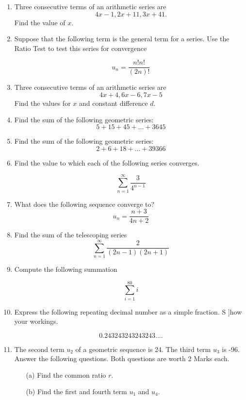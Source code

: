 \documentclass[a4paper,12pt]{article}
\begin{document}
\begin{enumerate}
\item Three consecutive terms of an arithmetic series are \[4x - 1, 2x +11, 3x + 41. \]
	Find the value of $x$.
	
\item Suppose that the following term is the general term for a series. Use the Ratio Test to test this series for convergence
	
	\[u_n=\frac{n!n!}{(2n)!}\]

\item 	Three consecutive terms of an arithmetic series are 
	\[4x+4,6x-6,7x-5\]
Find the values for $x$ and constant difference $d$.
\item Find the sum of the following geometric series: 
		\[5 + 15 + 45 +  \ldots + 3645\]
\item  Find the sum of the following geometric series: 
		\[2 + 6 + 18 +  \ldots + 39366		\]

\item Find the value to which each of the following series converges.

\[\sum_{n=1}^{\infty} \frac{3}{4^{n-1}}\]
\item What does the following sequence converge to?
 \[ u_n  = \frac{n+3}{4n+2}\]

\item Find the sum of the telescoping series  
\[ \sum^{\infty}_{n=1} \frac{2}{(2n-1)(2n+1)}\]




	\item  Compute the following summation
	
	\[ \sum_{i=1}^{80} i \]



	
	\item  Express the following repeating decimal number as a simple fraction. S
	]how your workings.
	
	\[0.243243243243243....\]



	\item 
	The second term $u_2$ of a geometric sequence is 24. The third term $u_3$ is -96. \\  Answer the following questions. Both questions are worth 2 Marks each.
	\begin{itemize}
		\item[(a)] Find the common ratio $r$. 
		\item[(b)] Find the first and fourth term $u_1$ and $u_4$.
	\end{itemize}
	

\end{enumerate}
\end{document}
